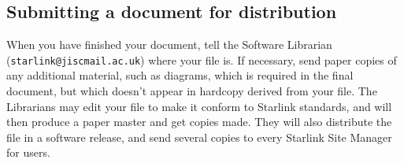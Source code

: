 \documentclass[twoside,11pt]{article}
\begin{document}
\subsection{Submitting a document for distribution}

When you have finished your document, tell the Software Librarian
({\tt starlink@jiscmail.ac.uk}) where your file is.
If necessary, send paper copies of any additional material, such as diagrams,
which is required in the final document, but which doesn't appear in hardcopy
derived from your file.
The Librarians may edit your file to make it conform to Starlink standards, and
will then produce a paper master and get copies made.
They will also distribute the file in a software release, and send several
copies to every Starlink Site Manager for users.
\end{document}
